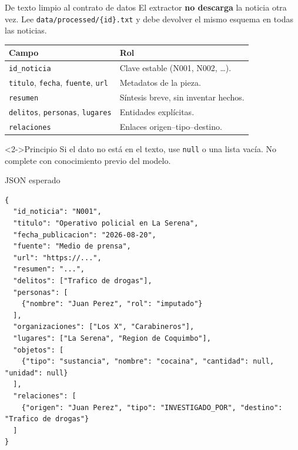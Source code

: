 \documentclass[11pt,aspectratio=169]{beamer}
\newcommand{\code}[1]{\texttt{#1}}
\begin{document}
\begin{frame}{De texto limpio al contrato de datos}
\small
El extractor \textbf{no descarga} la noticia otra vez. Lee \code{data/processed/\{id\}.txt} y debe devolver el mismo esquema en todas las noticias.

\vspace{0.2cm}
\begin{center}
\begin{tabular}{p{3.2cm}p{8.0cm}}
\toprule
\textbf{Campo} & \textbf{Rol} \\
\midrule
\code{id\_noticia} & Clave estable (N001, N002, \ldots). \\
\code{titulo}, \code{fecha}, \code{fuente}, \code{url} & Metadatos de la pieza. \\
\code{resumen} & Síntesis breve, sin inventar hechos. \\
\code{delitos}, \code{personas}, \code{lugares} & Entidades explícitas. \\
\code{relaciones} & Enlaces origen--tipo--destino. \\
\bottomrule
\end{tabular}
\end{center}

\begin{alertblock}<2->{Principio}
Si el dato no está en el texto, use \code{null} o una lista vacía. No complete con conocimiento previo del modelo.
\end{alertblock}
\end{frame}

\begin{frame}[fragile]{JSON esperado}
\tiny
\begin{lstlisting}
{
  "id_noticia": "N001",
  "titulo": "Operativo policial en La Serena",
  "fecha_publicacion": "2026-08-20",
  "fuente": "Medio de prensa",
  "url": "https://...",
  "resumen": "...",
  "delitos": ["Trafico de drogas"],
  "personas": [
    {"nombre": "Juan Perez", "rol": "imputado"}
  ],
  "organizaciones": ["Los X", "Carabineros"],
  "lugares": ["La Serena", "Region de Coquimbo"],
  "objetos": [
    {"tipo": "sustancia", "nombre": "cocaina", "cantidad": null, "unidad": null}
  ],
  "relaciones": [
    {"origen": "Juan Perez", "tipo": "INVESTIGADO_POR", "destino": "Trafico de drogas"}
  ]
}
\end{lstlisting}
\end{frame}

\end{document}
